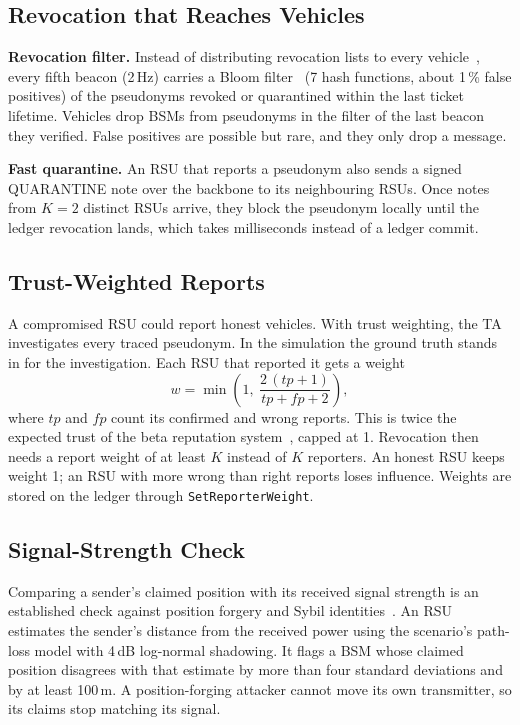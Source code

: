 \subsection{Revocation that Reaches Vehicles}

\textbf{Revocation filter.} Instead of distributing revocation lists to every
vehicle~\cite{raya2007securing}, every fifth beacon (2\,Hz) carries a Bloom filter~\cite{bloom1970} (7 hash functions, about 1\,\% false positives) of the pseudonyms
revoked or quarantined within the last ticket lifetime. Vehicles drop BSMs from pseudonyms in the
filter of the last beacon they verified. False positives are possible but rare, and they only drop
a message.

\textbf{Fast quarantine.} An RSU that reports a pseudonym also sends a signed QUARANTINE note over
the backbone to its neighbouring RSUs. Once notes from $K = 2$ distinct RSUs arrive, they block the
pseudonym locally until the ledger revocation lands, which takes milliseconds instead of a ledger
commit.

\subsection{Trust-Weighted Reports}\label{sec:trust}

A compromised RSU could report honest vehicles. With trust weighting, the TA investigates every
traced pseudonym. In the simulation the ground truth stands in for the investigation. Each RSU that
reported it gets a weight
\begin{equation}
  w = \min\!\left(1,\ \frac{2\,(\mathit{tp}+1)}{\mathit{tp}+\mathit{fp}+2}\right),
\end{equation}
where $\mathit{tp}$ and $\mathit{fp}$ count its confirmed and wrong reports. This is twice the expected
trust of the beta reputation system~\cite{josang2002beta}, capped at 1. Revocation then needs a
report weight of at least $K$ instead of $K$ reporters. An honest RSU keeps weight 1; an RSU with more
wrong than right reports loses influence. Weights are stored on the ledger through
\texttt{SetReporterWeight}.

\subsection{Signal-Strength Check}

Comparing a sender's claimed position with its received signal strength is an established check
against position forgery and Sybil identities~\cite{xiao2006sybil}. An RSU estimates the sender's
distance from the received power using the scenario's path-loss model
with 4\,dB log-normal shadowing. It flags a BSM whose claimed position disagrees with that estimate
by more than four standard deviations and by at least 100\,m. A position-forging attacker cannot
move its own transmitter, so its claims stop matching its signal.

